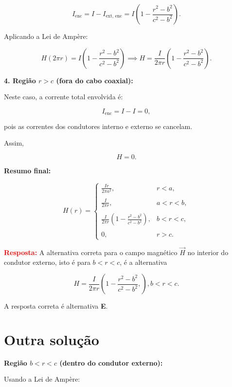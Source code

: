\begin{flushleft}
\[
I_{\text{enc}} = I - I_{\text{ext, enc}} = I \left(1 - \frac{r^2 - b^2}{c^2 - b^2}\right).
\]

Aplicando a Lei de Ampère:

\[
H (2 \pi r) = I \left(1 - \frac{r^2 - b^2}{c^2 - b^2}\right) \implies H = \frac{I}{2 \pi r} \left(1 - \frac{r^2 - b^2}{c^2 - b^2}\right).
\]

\vspace{0.3cm}
\textbf{4. Região \(r > c\) (fora do cabo coaxial):}

Neste caso, a corrente total envolvida é:

\[
I_{\text{enc}} = I - I = 0,
\]

pois as correntes dos condutores interno e externo se cancelam.

Assim,

\[
H = 0.
\]

\vspace{0.5cm}

\textbf{Resumo final:}

\[
H(r) = 
\begin{cases}
\displaystyle \frac{I r}{2 \pi a^2}, & r < a, \\
\\
\displaystyle \frac{I}{2 \pi r}, & a < r < b, \\
\\
\displaystyle \frac{I}{2 \pi r} \left(1 - \frac{r^2 - b^2}{c^2 - b^2}\right), & b < r < c, \\
\\
0, & r > c.
\end{cases}
\]

\vspace{0.5cm}

\textcolor{red}{\textbf{Resposta:}} A alternativa correta para o campo magnético \(\vec{H}\) no interior do condutor externo, isto é para \(b < r < c\), é a alternativa

\[
\boxed{
H = \frac{I}{2 \pi r} \left( 1 - \frac{r^2 - b^2}{c^2 - b^2},  \right), \textrm{\(b < r < c\)}.
}
\]

A resposta correta é alternativa \colorbox{green!50}{\textbf{E}}.

\vspace{0.3cm}
\section*{Outra solução}
\textbf{Região \(b < r < c\) (dentro do condutor externo):}

Usando a Lei de Ampère:


\end{flushleft}
